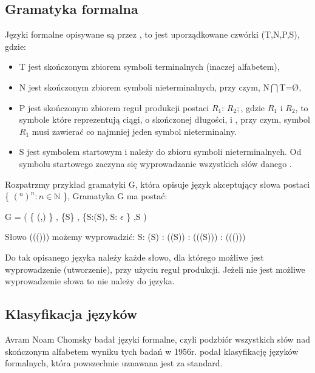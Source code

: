\subsection{Gramatyka formalna}
 
Języki formalne opisywane są przez ,
to jest uporządkowane czwórki (T,N,P,S), gdzie\cite{aho,link_gramatyka}:
\begin{itemize}
 \item T 
    jest skończonym zbiorem symboli terminalnych (inaczej alfabetem), 
 \item N 
    jest skończonym zbiorem symboli nieterminalnych, przy czym, N$\bigcap$T=\O,
 \item P 
    jest skończonym zbiorem reguł produkcji postaci  $R_1$: $R_2 ;$,
    gdzie $R_1$ i $R_2$,
    to symbole które reprezentują ciągi, o skończonej długości,
     i ,
    przy czym, symbol $R_1$ musi zawierać co najmniej jeden symbol nieterminalny.	    
 \item S 
    jest symbolem startowym i należy do zbioru symboli nieterminalnych.
   Od symbolu startowego  zaczyna się wyprowadzanie wszystkich słów danego .
\end{itemize}

Rozpatrzmy przykład gramatyki G, która opisuje język akceptujący słowa postaci \{ $(^n)^n: n \in \mathbb{N}$ \},
 Gramatyka G ma postać: 

    G = (  \{ (,) \} , \{S\} , \{S:(S), S: $\epsilon$ \} ,S )
    
Słowo ((())) możemy wyprowadzić:
    S: (S) : ((S)) : (((S))) : ((()))

Do tak opisanego języka należy każde słowo,
 dla którego możliwe jest wyprowadzenie (utworzenie),
 przy użyciu reguł produkcji.
Jeżeli nie jest możliwe wyprowadzenie słowa to nie należy do języka.

\subsection{Klasyfikacja języków} \label{pKlasy}
    
Avram Noam Chomsky badał języki formalne, czyli podzbiór wszystkich słów nad skończonym alfabetem 
wyniku tych badań w 1956r. podał klasyfikację języków formalnych, która powszechnie uznawana jest za standard.


